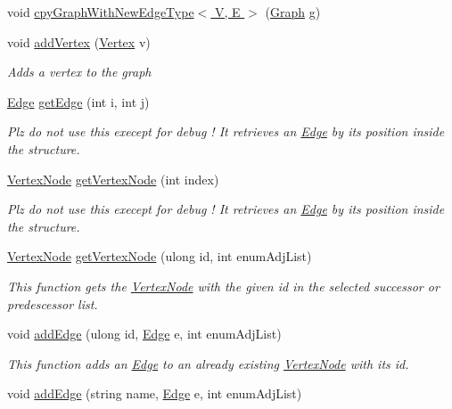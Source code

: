 \begin{DoxyCompactItemize}
void \hyperlink{classGraph_a9f4f47ae9bd4e6f575c494a168e204a9}{cpy\+Graph\+With\+New\+Edge\+Type$<$ V, E $>$} (\hyperlink{classGraph}{Graph} g)
\item 
void \hyperlink{classGraph_a79eca07963773b4858ddda0427f5a91f}{add\+Vertex} (\hyperlink{structVertex}{Vertex} v)
\begin{DoxyCompactList}\small\item\em Adds a vertex to the graph \end{DoxyCompactList}\item 
\hyperlink{classEdge}{Edge} \hyperlink{classGraph_aa1441a53cc2870fdad3504fbf594eb01}{get\+Edge} (int i, int j)
\begin{DoxyCompactList}\small\item\em Plz do not use this execept for debug ! It retrieves an \hyperlink{classEdge}{Edge} by its position inside the structure. \end{DoxyCompactList}\item 
\hyperlink{classVertexNode}{Vertex\+Node} \hyperlink{classGraph_a79ba5668642e260f6baced8749cf946d}{get\+Vertex\+Node} (int index)
\begin{DoxyCompactList}\small\item\em Plz do not use this execept for debug ! It retrieves an \hyperlink{classEdge}{Edge} by its position inside the structure. \end{DoxyCompactList}\item 
\hyperlink{classVertexNode}{Vertex\+Node} \hyperlink{classGraph_ac4a38465640c1aa5cd4f6e1e3b84c0a2}{get\+Vertex\+Node} (ulong id, int enum\+Adj\+List)
\begin{DoxyCompactList}\small\item\em This function gets the \hyperlink{classVertexNode}{Vertex\+Node} with the given id in the selected successor or predescessor list. \end{DoxyCompactList}\item 
void \hyperlink{classGraph_ab127ce44aba9820eae1ea8a2bc379b1c}{add\+Edge} (ulong id, \hyperlink{classEdge}{Edge} e, int enum\+Adj\+List)
\begin{DoxyCompactList}\small\item\em This function adds an \hyperlink{classEdge}{Edge} to an already existing \hyperlink{classVertexNode}{Vertex\+Node} with its id. \end{DoxyCompactList}\item 
void \hyperlink{classGraph_a59f97264cc54afd92c21c024e410f363}{add\+Edge} (string name, \hyperlink{classEdge}{Edge} e, int enum\+Adj\+List)

\end{DoxyCompactItemize}
